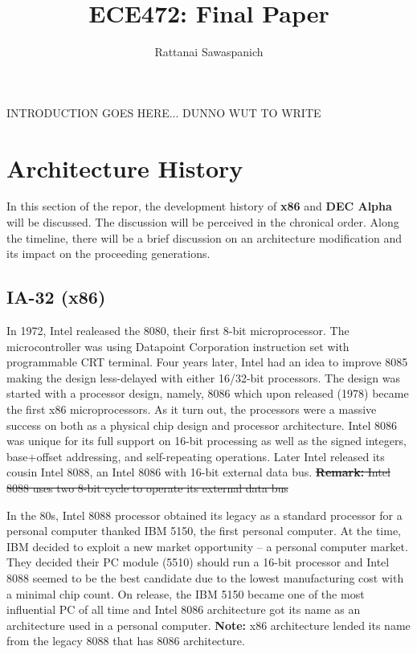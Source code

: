 \documentclass[letterpaper,10pt,titlepage]{article}
\title{ECE472: Final Paper}
\author{Rattanai Sawaspanich}
\begin{document}
\maketitle

INTRODUCTION GOES HERE... DUNNO WUT TO WRITE

\section{Architecture History}
In this section of the repor, the development history of \textbf{x86} and
\textbf{DEC Alpha} will be discussed. The discussion will be perceived in 
the chronical order.  Along the timeline, there will be a brief discussion
on an architecture modification and its impact on the proceeding 
generations. 

\subsection{IA-32 (x86)}
In 1972, Intel realeased the 8080, their first 8-bit microprocessor.  The
microcontroller was using Datapoint Corporation instruction set with 
programmable CRT terminal. Four years later, Intel had an idea to improve
8085 making the design less-delayed with either 16/32-bit processors.
The design was started with a processor design, namely, 8086  
which upon released (1978) became the first x86 microprocessors. 
As it turn out, the processors were a massive success on both as a physical
chip design and processor architecture. Intel 8086 was unique for its full 
support on 16-bit processing as well as the signed integers, base+offset 
addressing, and self-repeating operations. Later Intel released its cousin
Intel 8088, an Intel 8086 with 16-bit external data bus. 
\sout{\textbf{Remark:} Intel 8088 uses two 8-bit cycle to operate its 
external data bus}
\par
In the 80s, Intel 8088 processor obtained its legacy as a standard processor
for a personal computer thanked IBM 5150, the first personal computer.
At the time, IBM decided to exploit a new market opportunity -- a personal 
computer market. They decided their PC module (5510) should run a 16-bit 
processor and Intel 8088 seemed to be the best candidate due to the 
lowest manufacturing cost with a minimal chip count. On release, the IBM 5150
became one of the most influential PC of all time and Intel 8086 architecture 
got its name as an architecture used in a personal computer.  
\textbf{Note:} x86 architecture lended its name from the legacy 8088 that has
8086 architecture.
\end{document}
